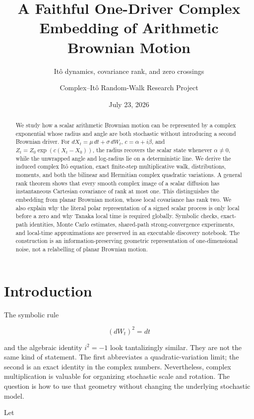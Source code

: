 \documentclass[
  english,
  10pt,
  letterpaper,
  DIV=11,
  numbers=noendperiod]{scrartcl}
\title{A Faithful One-Driver Complex Embedding of Arithmetic Brownian
Motion}
\subtitle{Itô dynamics, covariance rank, and zero crossings}
\author{Complex--Itô Random-Walk Research Project}
\date{July 23, 2026}
\renewcommand*\contentsname{Table of contents}
\newcommand\contentsname{Table of contents}
\theoremstyle{plain}
\theoremstyle{remark}
\begin{document}
\maketitle
\begin{abstract}
We study how a scalar arithmetic Brownian motion can be represented by a
complex exponential whose radius and angle are both stochastic without
introducing a second Brownian driver. For \(dX_t=\mu\,dt+\sigma\,dW_t\),
\(c=\alpha+i\beta\), and \(Z_t=Z_0\exp(c(X_t-X_0))\), the radius
recovers the scalar state whenever \(\alpha\ne0\), while the unwrapped
angle and log-radius lie on a deterministic line. We derive the induced
complex Itô equation, exact finite-step multiplicative walk,
distributions, moments, and both the bilinear and Hermitian complex
quadratic variations. A general rank theorem shows that every smooth
complex image of a scalar diffusion has instantaneous Cartesian
covariance of rank at most one. This distinguishes the embedding from
planar Brownian motion, whose local covariance has rank two. We also
explain why the literal polar representation of a signed scalar process
is only local before a zero and why Tanaka local time is required
globally. Symbolic checks, exact-path identities, Monte Carlo estimates,
shared-path strong-convergence experiments, and local-time
approximations are preserved in an executable discovery notebook. The
construction is an information-preserving geometric representation of
one-dimensional noise, not a relabelling of planar Brownian motion.
\end{abstract}

\renewcommand*\contentsname{Table of contents}
{
\setcounter{tocdepth}{2}
\tableofcontents
}

\section{Introduction}\label{sec-introduction}

The symbolic rule

\[
(dW_t)^2=dt
\]

and the algebraic identity \(i^2=-1\) look tantalizingly similar. They
are not the same kind of statement. The first abbreviates a
quadratic-variation limit; the second is an exact identity in the
complex numbers. Nevertheless, complex multiplication is valuable for
organizing stochastic scale and rotation. The question is how to use
that geometry without changing the underlying stochastic model.

Let
\end{document}
